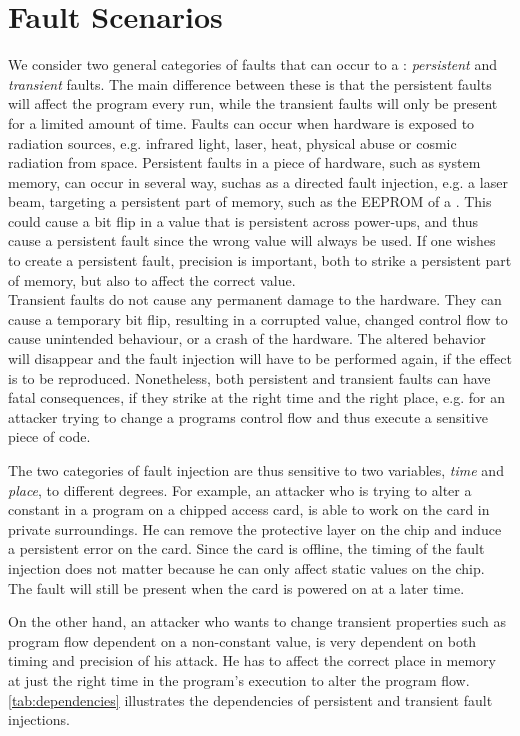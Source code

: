 \section{Fault Scenarios}\label{sec:faultsce}
We consider two general categories of faults that can occur to a \jc: \textit{persistent} and \textit{transient} faults. The main difference between these is that the persistent faults will affect the program every run, while the transient faults will only be present for a limited amount of time. Faults can occur when hardware is exposed to radiation sources, e.g. infrared light, laser, heat, physical abuse or cosmic radiation from space. 
Persistent faults in a piece of hardware, such as system memory, can occur in several way, suchas as a directed fault injection, e.g. a laser beam, targeting a persistent part of memory, such as the EEPROM of a \jc. This could cause a bit flip in a value that is persistent across power-ups, and thus cause a persistent fault since the wrong value will always be used. If one wishes to create a persistent fault, precision is important, both to strike a persistent part of memory, but also to affect the correct value.\\


Transient faults do not cause any permanent damage to the hardware. They can cause a temporary bit flip, resulting in a corrupted value, changed control flow to cause unintended behaviour, or a crash of the hardware. The altered behavior will disappear and the fault injection will have to be performed again, if the effect is to be reproduced.
Nonetheless, both persistent and transient faults can have fatal consequences, if they strike at the right time and the right place, e.g. for an attacker trying to change a programs control flow and thus execute a sensitive piece of code. 

The two categories of fault injection are thus sensitive to two variables, \textit{time} and \textit{place}, to different degrees. For example, an attacker who is trying to alter a constant in a program on a chipped access card, is able to work on the card in private surroundings. He can remove the protective layer on the chip and induce a persistent error on the card. Since the card is offline, the timing of the fault injection does not matter because he can only affect static values on the chip. The fault will still be present when the card is powered on at a later time. 

On the other hand, an attacker who wants to change transient properties such as program flow dependent on a non-constant value, is very dependent on both timing and precision of his attack. He has to affect the correct place in memory at just the right time in the program's execution to alter the program flow. \cref{tab:dependencies} illustrates the dependencies of persistent and transient fault injections.


